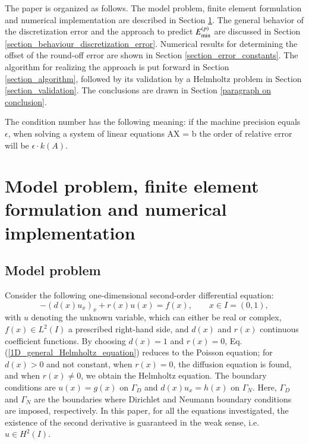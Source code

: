 \documentclass[review,3p]{elsarticle}
\begin{document}
The paper is organized as follows. The model problem, finite element formulation and numerical implementation are described in Section \ref{section_model_problem_FEM_formulation_numerical_implementation}. The general behavior of the discretization error and the approach to predict ${E}_{\rm {min}}^{(p)}$ are discussed in Section \ref{section_behaviour_discretization_error}. Numerical results for determining the offset of the round-off error are shown in Section \ref{section_error_constants}. The algorithm for realizing the approach is put forward in Section \ref{section_algorithm}, followed by its validation by a Helmholtz problem in Section \ref{section_validation}. The conclusions are drawn in Section \ref{paragraph on conclusion}.


The condition number has the following meaning: if the machine precision equals $\epsilon$, when solving a system of linear equations AX = b the order of relative error will be $\epsilon \cdot k(A)$\cite{Alglib_custom}.                       %

\section{Model problem, finite element formulation and numerical implementation}	\label{section_model_problem_FEM_formulation_numerical_implementation}

\subsection{Model problem}

Consider the following one-dimensional second-order differential equation:
\begin{equation}
  -\left(d(x) u_x \right)_x + r(x)u(x) = f(x),\qquad x \in I = (0,1),	\label{1D_general_Helmholtz_equation}
\end{equation}
with $u$ denoting the unknown variable, which can either be real or complex, $f(x) \in L^2 (I)$ a prescribed right-hand side, and $d(x)$ and $r(x)$ continuous coefficient functions.
By choosing $d(x)=1$ and $r(x)=0$, Eq. (\ref{1D_general_Helmholtz_equation}) reduces to the Poisson equation; for $d(x)>0$ and not constant, when $r(x)=0$, the diffusion equation is found, and when $r(x) \neq 0$, we obtain the Helmholtz equation. 
The boundary conditions are $u(x)=g(x)$ on $\Gamma_D$ and $d(x)u_x=h(x)$ on $\Gamma_N$. Here, $\Gamma_D$ and $\Gamma_N$ are the boundaries where Dirichlet and Neumann boundary conditions are imposed, respectively.
In this paper, for all the equations investigated, the existence of the second derivative is guaranteed in the weak sense, i.e. $u \in H^2 (I)$.
\end{document}

